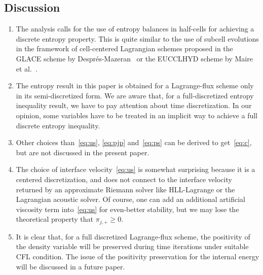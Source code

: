 \documentclass[graybox]{svmult}
\begin{document}
\subsection{Discussion}
%
\begin{enumerate}
\item The analysis calls for the use of entropy balances in half-cells for
achieving a discrete entropy property. This is quite similar to the use of subcell
evolutions in the framework of cell-centered Lagrangian schemes proposed in the GLACE scheme by Despr\'es-Mazeran~\cite{DESPRES} or the EUCCLHYD scheme by Maire et al.~\cite{MAIRE}. %
%
\item The entropy result in this paper is obtained for a Lagrange-flux scheme only in its semi-discretized form. We are aware that, for a full-discretized entropy inequality result, we have to pay attention about time discretization. In our opinion, some variables have to be treated in an implicit way to achieve a full discrete entropy inequality. %
%
\item Other choices than~\eqref{eq:us}, \eqref{eq:pjp} and~\eqref{eq:ps} can be derived
to get~\eqref{eq:c}, but are not discussed in the present paper. %
%
\item The choice of interface velocity~\eqref{eq:us} is somewhat surprising because
it is a centered discretization, and does not connect to the interface velocity
returned by an approximate Riemann solver like HLL-Lagrange or the Lagrangian acoustic 
solver. Of course, one can add an additional artificial viscosity term into~\eqref{eq:us}
for even-better stability, but we may lose the theoretical  property that 
$\pi_{j,+}\geq 0$. %
%
\item It is clear that, for a full discretized Lagrange-flux scheme, the positivity of the density variable will be preserved during time iterations under suitable CFL condition. The issue of the positivity preservation for the internal energy will be discussed in a future paper.
\end{enumerate}
% 
\vspace{-0.8cm}
\end{document}
